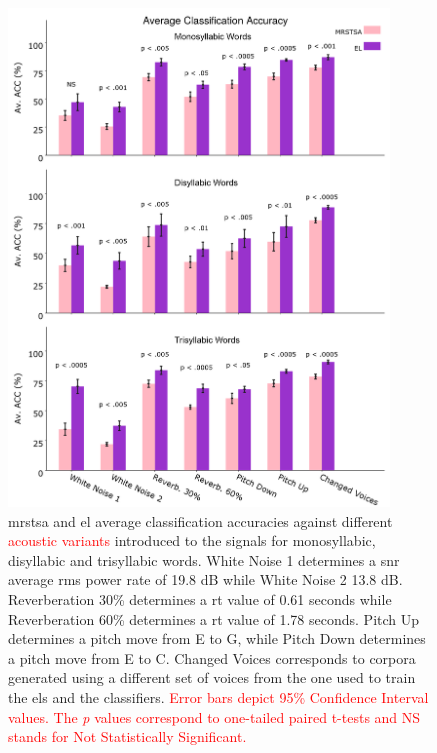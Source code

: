 \documentclass[10pt,letterpaper]{article}
\begin{document}
\begin{figure}[h!]
    \centering
    \includegraphics[width=0.9\textwidth]{PLOT.png}
    \caption{\gls{mrstsa} and \gls{el} average classification accuracies against different \textcolor{red}{acoustic variants} introduced to the signals
    for monosyllabic, disyllabic and trisyllabic words.
    White Noise 1 determines a \gls{snr} average \gls{rms} power rate of 19.8 dB while White Noise 2 13.8 dB.
    Reverberation 30\% determines a \gls{rt} value of 0.61 seconds while Reverberation 60\% determines a \gls{rt} value of 1.78 seconds.
    Pitch Up determines a pitch move from E to G, while Pitch Down determines a pitch move from E to C. Changed Voices corresponds to corpora generated using a different set of voices from the one used to train the \glspl{el} and the classifiers. \textcolor{red}{Error bars depict 95\% Confidence Interval values. The \emph{p} values correspond to one-tailed paired t-tests and NS stands for Not Statistically Significant.}}
    \label{fig:PLOT}
\end{figure}

\end{document}
